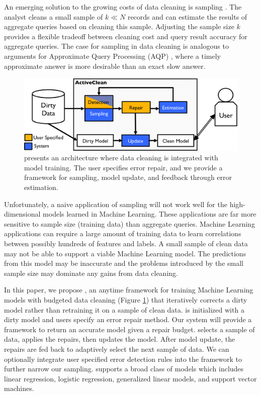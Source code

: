 An emerging solution to the growing costs of data cleaning is sampling \cite{wang1999sample}. The analyst cleans a small sample of $k \ll N$ records and can estimate the results of aggregate queries based on cleaning this sample.
Adjusting the sample size $k$ provides a flexible tradeoff between cleaning cost and query result accuracy for aggregate queries.
The case for sampling in data cleaning is analogous to arguments for Approximate Query Processing (AQP) \cite{DBLP:conf/eurosys/AgarwalMPMMS13}, where a timely approximate answer is more desirable than an exact slow answer. 

\begin{figure}[t]
\centering
 \includegraphics[width=\columnwidth]{figs/arch.png}
 \caption{\sysfull presents an architecture where data cleaning is integrated with model training. The user specifies error repair, and we provide a framework for sampling, model update, and feedback through error estimation. \label{sys-arch}}\vspace{-2em}
\end{figure}

Unfortunately, a naive application of sampling will not work well for the high-dimensional models learned in Machine Learning.
These applications are far more sensitive to sample size (training data) than aggregate queries.
Machine Learning applications can require a large amount of training data to learn correlations between possibly hundreds of features and labels.
A small sample of clean data may not be able to support a viable Machine Learning model.
The predictions from this model may be inaccurate and the problems introduced by the small sample size may dominate any gains from data cleaning. 

In this paper, we propose \sys, an anytime framework for training Machine Learning models with budgeted data cleaning (Figure \ref{sys-arch}) that iteratively corrects a dirty model rather than retraining it on a sample of clean data.
\sys is initialized with a dirty model and users specify an error repair method.
Our system will provide a framework to return an accurate model given a repair budget.
\sys selects a sample of data, applies the repairs, then updates the model.
After model update, the repairs are fed back to adaptively select the next sample of data.
We can optionally integrate user specified error detection rules into the framework to further narrow our sampling.
\sys supports a broad class of models which includes linear regression, logistic regression, generalized linear models, and support vector machines.

